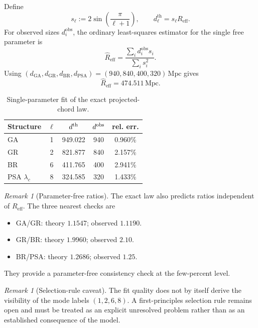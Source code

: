 \documentclass[
  aps,
  prd,
  reprint,
  superscriptaddress,
  nofootinbib,
  longbibliography,
  floatfix,
  amsmath,
  amssymb
]{revtex4-2}
\theoremstyle{plain}
\theoremstyle{definition}
\theoremstyle{remark}
\newtheorem{remark}[theorem]{Remark}
\newcommand{\Reff}{R_{\mathrm{eff}}}
\begin{document}
Define
\begin{equation}
  s_\ell := 2\sin\!\left(\frac{\pi}{\ell+1}\right),
  \qquad
  d_\ell^{\mathrm{th}} = s_\ell \Reff .
\end{equation}
For observed sizes $d_i^{\mathrm{obs}}$, the ordinary least-squares
estimator for the single free parameter is
\begin{equation}
  \widehat{R}_{\mathrm{eff}}
  = \frac{\sum_i d_i^{\mathrm{obs}} s_i}{\sum_i s_i^2}.
  \label{eq:bestfitR}
\end{equation}
Using $(d_{\mathrm{GA}},d_{\mathrm{GR}},d_{\mathrm{BR}},d_{\mathrm{PSA}})
=(940,840,400,320)\,\mathrm{Mpc}$ gives
\begin{equation}
  \widehat{R}_{\mathrm{eff}} = 474.511\,\mathrm{Mpc}.
\end{equation}

\begin{table}[t]
\centering
\scriptsize
\caption{Single-parameter fit of the exact projected-chord law.}
\label{tab:fitv7}
\begin{tabular}{lcccc}
\toprule
Structure & $\ell$ & $d^{\rm th}$ & $d^{\rm obs}$ & rel. err. \\
\midrule
GA & 1 & 949.022 & 940 & 0.960\% \\
GR & 2 & 821.877 & 840 & 2.157\% \\
BR & 6 & 411.765 & 400 & 2.941\% \\
PSA $\lambda_c$ & 8 & 324.585 & 320 & 1.433\% \\
\bottomrule
\end{tabular}
\end{table}

\begin{remark}[Parameter-free ratios]
The exact law also predicts ratios independent of $\Reff$. The three
nearest checks are
\begin{itemize}[leftmargin=*,noitemsep]
  \item GA/GR: theory $1.1547$; observed $1.1190$.
  \item GR/BR: theory $1.9960$; observed $2.10$.
  \item BR/PSA: theory $1.2686$; observed $1.25$.
\end{itemize}
They provide a parameter-free consistency check at the few-percent level.
\end{remark}

\begin{remark}[Selection-rule caveat]
The fit quality does not by itself derive the visibility of the mode
labels $(1,2,6,8)$. A first-principles selection rule remains open and
must be treated as an explicit unresolved problem rather than as an
established consequence of the model.
\end{remark}
\end{document}

